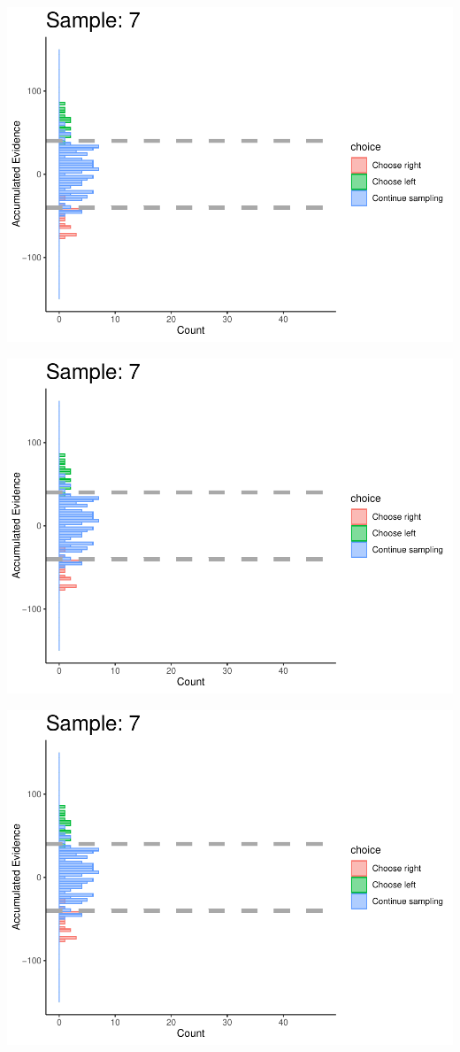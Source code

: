 \documentclass[
]{book}
\begin{document}
\begin{center}\includegraphics[width=0.8\linewidth]{LateNightBayes_files/figure-latex/collapsing_check-62} \end{center}

\begin{center}\includegraphics[width=0.8\linewidth]{LateNightBayes_files/figure-latex/collapsing_check-63} \end{center}

\begin{center}\includegraphics[width=0.8\linewidth]{LateNightBayes_files/figure-latex/collapsing_check-64} \end{center}
\end{document}
